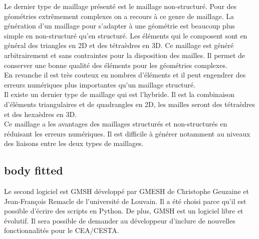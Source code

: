 Le dernier type de maillage présenté est le maillage non-structuré. Pour des géométries extrêmement complexes on a recours à ce genre de maillage. La génération d'un maillage pour s'adapter à une géométrie est beaucoup plus simple en non-structuré qu’en structuré. Les éléments qui le composent sont en général des triangles en 2D et des tétraèdres en 3D. Ce maillage est généré arbitrairement et sans contraintes pour la disposition des mailles. Il permet de conserver une bonne qualité des éléments pour les géométries complexes.\\
En revanche il est très couteux en nombres d'éléments et il peut engendrer des erreurs numériques plus importantes qu’un maillage structuré.\\
Il existe un dernier type de maillage qui est l’hybride. Il est la combinaison d'éléments triangulaires et de quadrangles en 2D, les mailles seront des tétraèdres et des hexaèdres en 3D.\\
Ce maillage a les avantages des maillages structurés et non-structurés en réduisant les erreurs numériques. Il est difficile à générer notamment au niveaux des liaisons entre les deux types de maillages.



\subsection{body fitted}
Le second logiciel est GMSH développé par GMESH de Christophe Geuzaine et Jean-François Remacle de l'université de Louvain. Il a été choisi parce qu'il est possible d'écrire des scripts en Python. De plus, GMSH est un logiciel libre et évolutif. Il sera possible de demander au développeur d'inclure de nouvelles fonctionnalités pour le CEA/CESTA.

